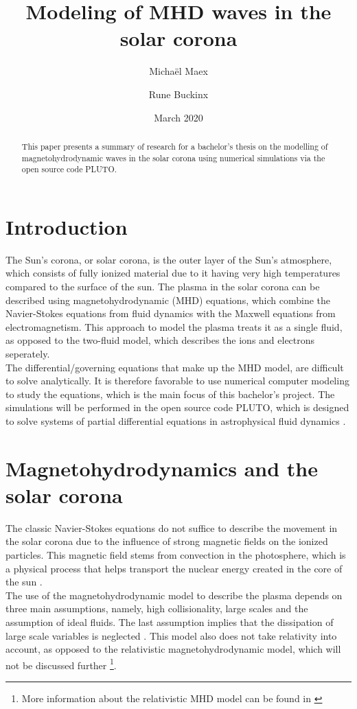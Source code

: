\documentclass[11pt]{article}
\title{Modeling of MHD waves in the solar corona}
\author{Micha\"el Maex \and Rune Buckinx}
\date{March 2020}
\begin{document}
\maketitle

\begin{abstract}
    This paper presents a summary of research for a bachelor's thesis on the modelling of magnetohydrodynamic waves in the solar corona using numerical simulations via the open source code PLUTO. 
\end{abstract}
\tableofcontents
\newpage
\section{Introduction} \label{sec:introduction}
The Sun's corona, or solar corona, is the outer layer of the Sun's atmosphere, which consists of fully ionized material due to it having very high temperatures compared to the surface of the sun. The plasma in the solar corona can be described using magnetohydrodynamic (MHD) equations, which combine the Navier-Stokes equations from fluid dynamics with the Maxwell equations from electromagnetism. This approach to model the plasma treats it as a single fluid, as opposed to the two-fluid model, which describes the ions and electrons seperately. \\

The differential/governing equations that make up the MHD model, are difficult to solve analytically. It is therefore favorable to use numerical computer modeling to study the equations, which is the main focus of this bachelor's project. The simulations will be performed in the open source code PLUTO, which is designed to solve systems of partial differential equations in astrophysical fluid dynamics \cite{mignone2011pluto}. 
\section{Magnetohydrodynamics and the solar corona} \label{sec:magnetohydrodynamics_and_the_solar_corona}
The classic Navier-Stokes equations do not suffice to describe the movement in the solar corona due to the influence of strong magnetic fields on the ionized particles. This magnetic field stems from convection in the photosphere, which is a physical process that helps transport the nuclear energy created in the core of the sun \cite{brun2017magnetism}.\\

The use of the magnetohydrodynamic model to describe the plasma depends on three main assumptions, namely, high collisionality, large scales and the assumption of ideal fluids. The last assumption implies that the dissipation of large scale variables is neglected \cite{goedbloed2004principles}. This model also does not take relativity into account, as opposed to the relativistic magnetohydrodynamic model, which will not be discussed further \footnote{More information about the relativistic MHD model can be found in \cite{karas2005introduction}}.
\end{document}
